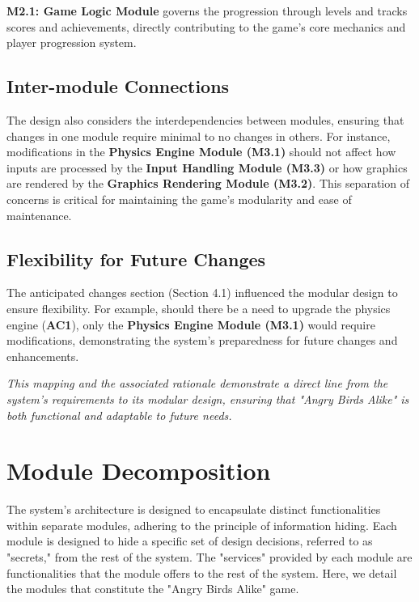\documentclass[12pt]{article}
\begin{document}
\textbf{M2.1: Game Logic Module} governs the progression through levels and tracks scores and achievements, directly contributing to the game's core mechanics and player progression system.

\subsection{Inter-module Connections}

The design also considers the interdependencies between modules, ensuring that changes in one module require minimal to no changes in others. For instance, modifications in the \textbf{Physics Engine Module (M3.1)} should not affect how inputs are processed by the \textbf{Input Handling Module (M3.3)} or how graphics are rendered by the \textbf{Graphics Rendering Module (M3.2)}. This separation of concerns is critical for maintaining the game's modularity and ease of maintenance.

\subsection{Flexibility for Future Changes}

The anticipated changes section (Section 4.1) influenced the modular design to ensure flexibility. For example, should there be a need to upgrade the physics engine (\textbf{AC1}), only the \textbf{Physics Engine Module (M3.1)} would require modifications, demonstrating the system's preparedness for future changes and enhancements.

\textit{This mapping and the associated rationale demonstrate a direct line from the system's requirements to its modular design, ensuring that "Angry Birds Alike" is both functional and adaptable to future needs.}

\section{Module Decomposition}

The system's architecture is designed to encapsulate distinct functionalities within separate modules, adhering to the principle of information hiding. Each module is designed to hide a specific set of design decisions, referred to as "secrets," from the rest of the system. The "services" provided by each module are functionalities that the module offers to the rest of the system. Here, we detail the modules that constitute the "Angry Birds Alike" game.
\end{document}

